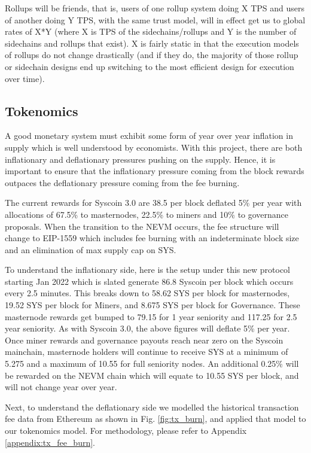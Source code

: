 \documentclass[peerreview]{ieeesyscoin}
\begin{document}
Rollups will be friends, that is, users of one rollup system doing X TPS and users of another doing Y TPS, with the same trust model, will in effect get us to global rates of X*Y (where X is TPS of the sidechains/rollups and Y is the number of sidechains and rollups that exist). X is fairly static in that the execution models of rollups do not change drastically (and if they do, the majority of those rollup or sidechain designs end up switching to the most efficient design for execution over time).

\subsection{Tokenomics}

A good monetary system must exhibit some form of year over year inflation in supply which is well understood by economists. With this project, there are both inflationary and deflationary pressures pushing on the supply. Hence, it is important to ensure that the inflationary pressure coming from the block rewards outpaces the deflationary pressure coming from the fee burning. 

The current rewards for Syscoin 3.0 are 38.5 per block deflated 5\% per year with allocations of 67.5\% to masternodes, 22.5\% to miners and 10\% to governance proposals. When the transition to the NEVM occurs, the fee structure will change to EIP-1559 which includes fee burning with an indeterminate block size and an elimination of max supply cap on SYS.

To understand the inflationary side, here is the setup under this new protocol starting Jan 2022 which is slated generate 86.8 Syscoin per block which occurs every 2.5 minutes. This breaks down to 58.62 SYS per block for masternodes, 19.52 SYS per block for Miners, and 8.675 SYS per block for Governance. These masternode rewards get bumped to 79.15 for 1 year seniority and 117.25 for 2.5 year seniority. As with Syscoin 3.0, the above figures will deflate 5\% per year. Once miner rewards and governance payouts reach near zero on the Syscoin mainchain, masternode holders will continue to receive SYS at a minimum of 5.275 and a maximum of 10.55 for full seniority nodes. An additional 0.25\% will be rewarded on the NEVM chain which will equate to 10.55 SYS per block, and will not change year over year.

Next, to understand the deflationary side we modelled the historical transaction fee data from Ethereum as shown in Fig. \ref{fig:tx_burn}, and applied that model to our tokenomics model. For methodology, please refer to Appendix \ref{appendix:tx_fee_burn}.
\end{document}
